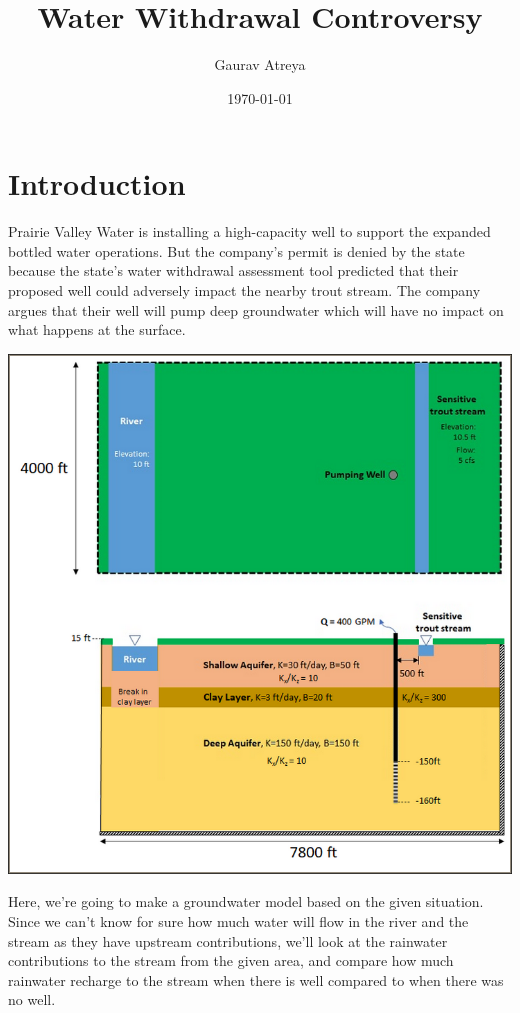 \documentclass[titlepage,12pt]{unisubmission}
\author{Gaurav Atreya}
\date{\today}
\title{Water Withdrawal Controversy}
\begin{document}
\maketitle
\setcounter{tocdepth}{2}
\tableofcontents
\section{Introduction}
\label{sec:org2d26311}

Prairie Valley Water is installing a high-capacity well to support the expanded bottled water operations. But the company's permit is denied by the state because the state’s water withdrawal assessment tool predicted that their proposed well could adversely impact the nearby trout stream. The company argues that their well will pump deep groundwater which will have no impact on what happens at the surface. 

\begin{center}
\includegraphics[width=.9\linewidth]{./images/tutorial-3-site.png}
\end{center}

Here, we're going to make a groundwater model based on the given situation. Since we can't know for sure how much water will flow in the river and the stream as they have upstream contributions, we'll look at the rainwater contributions to the stream from the given area, and compare how much rainwater recharge to the stream when there is well compared to when there was no well.
\end{document}
